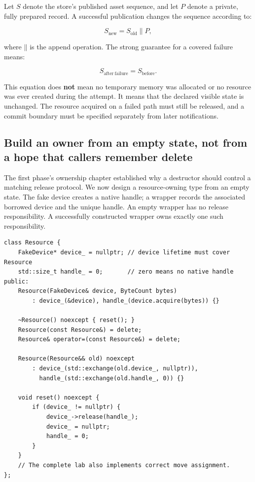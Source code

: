 Let \(S\) denote the store's published asset sequence, and let \(P\) denote a private, fully prepared record. A successful publication changes the sequence according to:

\[
S_{\mathrm{new}} = S_{\mathrm{old}} \mathbin{\|} P,
\]

where \(\mathbin{\|}\) is the append operation. The strong guarantee for a covered failure means:

\[
S_{\mathrm{after\ failure}} = S_{\mathrm{before}}.
\]

This equation does \textbf{not} mean no temporary memory was allocated or no resource was ever created during the attempt. It means that the declared visible state is unchanged. The resource acquired on a failed path must still be released, and a commit boundary must be specified separately from later notifications.

\subsection{Build an owner from an empty state, not from a hope that callers remember delete}\label{05-engine-i-ch004-build-an-owner-from-an-empty-state-not-from-a-hope-that-callers-remember-delete}

\hypertarget{05-engine-i-ch004-build-an-owner-from-an-empty-state-not-from-a-hope-that-callers-remember-delete}{}

The first phase's ownership chapter established why a destructor should control a matching release protocol. We now design a resource-owning type from an empty state. The fake device creates a native handle; a wrapper records the associated borrowed device and the unique handle. An empty wrapper has no release responsibility. A successfully constructed wrapper owns exactly one such responsibility.

\begin{verbatim}
class Resource {
    FakeDevice* device_ = nullptr; // device lifetime must cover Resource
    std::size_t handle_ = 0;       // zero means no native handle
public:
    Resource(FakeDevice& device, ByteCount bytes)
        : device_(&device), handle_(device.acquire(bytes)) {}

    ~Resource() noexcept { reset(); }
    Resource(const Resource&) = delete;
    Resource& operator=(const Resource&) = delete;

    Resource(Resource&& old) noexcept
        : device_(std::exchange(old.device_, nullptr)),
          handle_(std::exchange(old.handle_, 0)) {}

    void reset() noexcept {
        if (device_ != nullptr) {
            device_->release(handle_);
            device_ = nullptr;
            handle_ = 0;
        }
    }
    // The complete lab also implements correct move assignment.
};
\end{verbatim}


